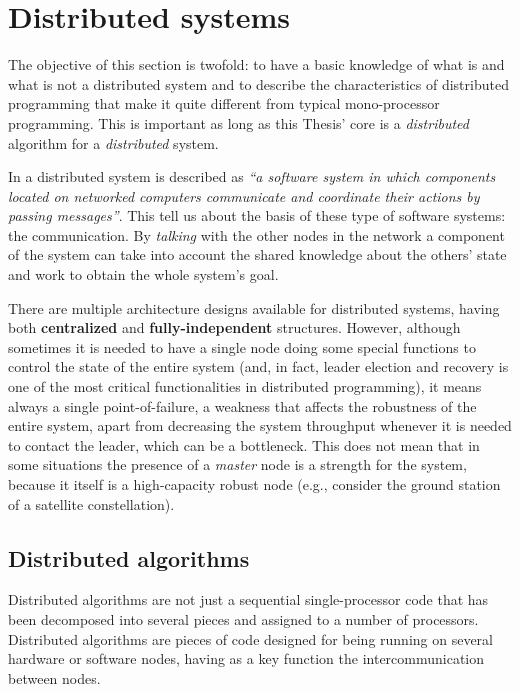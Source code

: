 
\section{Distributed systems}

The objective of this section is twofold: to have a basic knowledge of what is and what is not a distributed system and to describe the characteristics of distributed programming that make it quite different from typical mono-processor programming. This is important as long as this Thesis' core is a \emph{distributed} algorithm for a \emph{distributed} system.

In \cite{Coulouris:2011:DSC:2029110} a distributed system is described as \textit{``a software system in which components located on networked computers communicate and coordinate their actions by passing messages''}. This tell us about the basis of these type of software systems: the communication. By \emph{talking} with the other nodes in the network a component of the system can take into account the shared knowledge about the others' state and work to obtain the whole system's goal.

There are multiple architecture designs available for distributed systems, having both \textbf{centralized} and \textbf{fully-independent} structures. However, although sometimes it is needed to have a single node doing some special functions to control the state of the entire system (and, in fact, leader election and recovery is one of the most critical functionalities in distributed programming), it means always a single point-of-failure, a weakness that affects the robustness of the entire system, apart from decreasing the system throughput whenever it is needed to contact the leader, which can be a bottleneck. This does not mean that in some situations the presence of a \emph{master} node is a strength for the system, because it itself is a high-capacity robust node (e.g., consider the ground station of a satellite constellation).

\subsection{Distributed algorithms}
 
Distributed algorithms are not just a sequential single-processor code that has been decomposed into several pieces and assigned to a number of processors. Distributed algorithms are pieces of code designed for being running on several hardware or software nodes, having as a key function the intercommunication between nodes.

